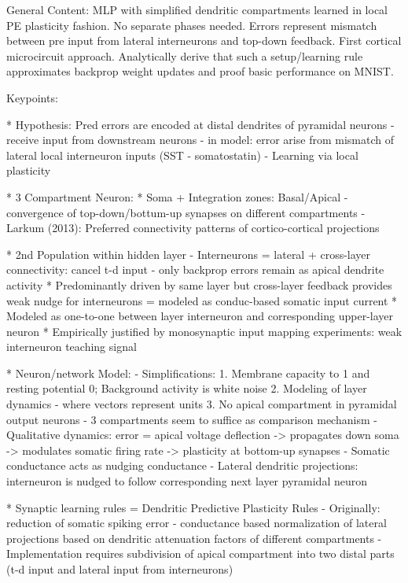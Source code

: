 \documentclass{article}
\theoremstyle{definition}
\begin{document}
General Content: MLP with simplified dendritic compartments learned in local PE plasticity fashion. No separate phases needed. Errors represent mismatch between pre input from lateral interneurons and top-down feedback. First cortical microcircuit approach. Analytically derive that such a setup/learning rule approximates backprop weight updates and proof basic performance on MNIST.


Keypoints:

* Hypothesis: Pred errors are encoded at distal dendrites of pyramidal neurons - receive input from downstream neurons - in model: error arise from mismatch of lateral local interneuron inputs (SST - somatostatin) - Learning via local plasticity

* 3 Compartment Neuron:
    * Soma + Integration zones: Basal/Apical - convergence of top-down/bottum-up synapses on different compartments - Larkum (2013): Preferred connectivity patterns of cortico-cortical projections

* 2nd Population within hidden layer - Interneurons = lateral + cross-layer connectivity: cancel t-d input - only backprop errors remain as apical dendrite activity
    * Predominantly driven by same layer but cross-layer feedback provides weak nudge for interneurons = modeled as conduc-based somatic input current
    * Modeled as one-to-one between layer interneuron and corresponding upper-layer neuron
    * Empirically justified by monosynaptic input mapping experiments: weak interneuron teaching signal

* Neuron/network Model:
    - Simplifications:
        1. Membrane capacity to 1 and resting potential 0; Background activity is white noise
        2. Modeling of layer dynamics - where vectors represent units
        3. No apical compartment in pyramidal output neurons - 3 compartments seem to suffice as comparison mechanism
    - Qualitative dynamics: error = apical voltage deflection -> propagates down soma -> modulates somatic firing rate -> plasticity at bottom-up synapses
    - Somatic conductance acts as nudging conductance
    - Lateral dendritic projections: interneuron is nudged to follow corresponding next layer pyramidal neuron

* Synaptic learning rules = Dendritic Predictive Plasticity Rules
    - Originally: reduction of somatic spiking error
    - conductance based normalization of lateral projections based on dendritic attenuation factors of different compartments
    - Implementation requires subdivision of apical compartment into two distal parts (t-d input and lateral input from interneurons)
\end{document}
